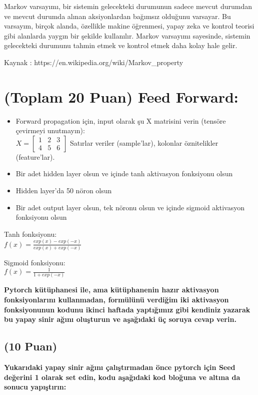 \documentclass[11pt]{article}
\begin{document}
Markov varsayımı, bir sistemin gelecekteki durumunun sadece mevcut durumdan ve mevcut durumda alınan aksiyonlardan bağımsız olduğunu varsayar. Bu varsayım, birçok alanda, özellikle makine öğrenmesi, yapay zeka ve kontrol teorisi gibi alanlarda yaygın bir şekilde kullanılır. Markov varsayımı sayesinde, sistemin gelecekteki durumunu tahmin etmek ve kontrol etmek daha kolay hale gelir.

Kaynak : https://en.wikipedia.org/wiki/Markov_property

\section{(Toplam 20 Puan) Feed Forward:}
 
\begin{itemize}
    \item Forward propagation için, input olarak şu X matrisini verin (tensöre çevirmeyi unutmayın):\\
    $X = \begin{bmatrix}
        1 & 2 & 3\\
        4 & 5 & 6
        \end{bmatrix}$
    Satırlar veriler (sample'lar), kolonlar öznitelikler (feature'lar).
    \item Bir adet hidden layer olsun ve içinde tanh aktivasyon fonksiyonu olsun
    \item Hidden layer'da 50 nöron olsun
    \item Bir adet output layer olsun, tek nöronu olsun ve içinde sigmoid aktivasyon fonksiyonu olsun
\end{itemize}

Tanh fonksiyonu:\\
$f(x) = \frac{exp(x) - exp(-x)}{exp(x) + exp(-x)}$
\vspace{.2in}

Sigmoid fonksiyonu:\\
$f(x) = \frac{1}{1 + exp(-x)}$

\vspace{.2in}
 \textbf{Pytorch kütüphanesi ile, ama kütüphanenin hazır aktivasyon fonksiyonlarını kullanmadan, formülünü verdiğim iki aktivasyon fonksiyonunun kodunu ikinci haftada yaptığımız gibi kendiniz yazarak bu yapay sinir ağını oluşturun ve aşağıdaki üç soruya cevap verin.}
 
\subsection{(10 Puan)} \textbf{Yukarıdaki yapay sinir ağını çalıştırmadan önce pytorch için Seed değerini 1 olarak set edin, kodu aşağıdaki kod bloğuna ve altına da sonucu yapıştırın:}
\end{document}
